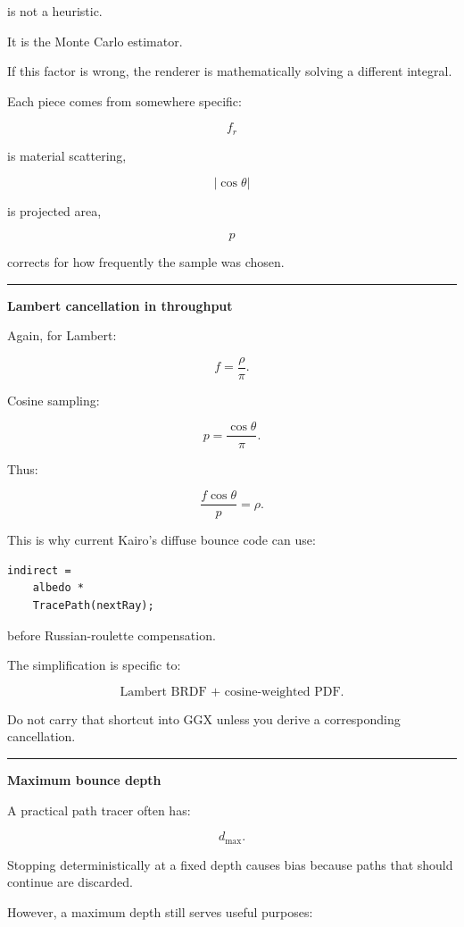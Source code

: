 is not a heuristic.

It is the Monte Carlo estimator.

If this factor is wrong, the renderer is mathematically solving a different integral.

Each piece comes from somewhere specific:

\[
f_r
\]

is material scattering,

\[
|\cos\theta|
\]

is projected area,

\[
p
\]

corrects for how frequently the sample was chosen.

\begin{center}\rule{0.5\linewidth}{0.5pt}\end{center}

\textbf{Lambert cancellation in throughput}

Again, for Lambert:

\[
f=\frac{\rho}{\pi}.
\]

Cosine sampling:

\[
p=\frac{\cos\theta}{\pi}.
\]

Thus:

\[
\frac{f\cos\theta}{p}
=
\rho.
\]

This is why current Kairo's diffuse bounce code can use:

\begin{verbatim}
indirect =
    albedo *
    TracePath(nextRay);
\end{verbatim}

before Russian-roulette compensation.

The simplification is specific to:

\[
\boxed{
\text{Lambert BRDF + cosine-weighted PDF}.
}
\]

Do not carry that shortcut into GGX unless you derive a corresponding cancellation.

\begin{center}\rule{0.5\linewidth}{0.5pt}\end{center}

\textbf{Maximum bounce depth}

A practical path tracer often has:

\[
d_{\max}.
\]

Stopping deterministically at a fixed depth causes bias because paths that should continue are discarded.

However, a maximum depth still serves useful purposes:

